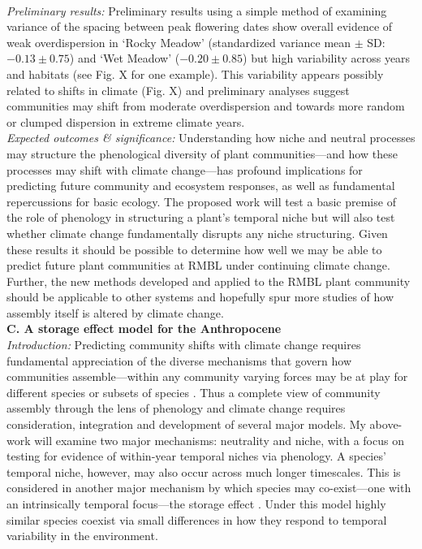 \documentclass[12pt,a4paper,oneside]{article}
\begin{document}
\vspace{1.5ex}\\
\emph{Preliminary results:} Preliminary results using a simple method of examining variance of the spacing between peak flowering dates show overall evidence of weak overdispersion in `Rocky Meadow' (standardized variance mean $\pm$ SD: $-0.13 \pm 0.75$)  and `Wet Meadow' ($-0.20 \pm 0.85$) but high variability across years and habitats (see Fig. X for one example). This variability appears possibly related to shifts in climate (Fig. X) and preliminary analyses suggest communities may shift from moderate overdispersion and towards more random or clumped dispersion in extreme climate years. 
\vspace{1.5ex}\\
\emph{Expected outcomes \& significance:}
Understanding how niche and neutral processes may structure the phenological diversity of plant communities---and how these processes may shift with climate change---has profound implications for predicting future community and ecosystem responses, as well as fundamental repercussions for basic ecology. The proposed work will test a basic premise of the role of phenology in structuring a plant's temporal niche but will also test whether climate change fundamentally disrupts any niche structuring. Given these results it should be possible to determine how well we may be able to predict future plant communities at RMBL under continuing climate change. Further, the new methods developed and applied to the RMBL plant community should be applicable to other systems and hopefully spur more studies of how assembly itself is altered by climate change. 
\vspace{1.5ex}\\
{\bf C. A storage effect model for the Anthropocene}
\vspace{1.5ex}\\
\emph{Introduction:} Predicting community shifts with climate change requires fundamental appreciation of the diverse mechanisms that govern how communities assemble---within any community varying forces may be at play for different species or subsets of species \citep{macarthur1958}. Thus a complete view of community assembly through the lens of phenology and climate change requires consideration, integration and development of several major models. My above-work will examine two major mechanisms: neutrality and niche, with a focus on testing for evidence of within-year temporal niches via phenology. A species' temporal niche, however, may also occur across much longer timescales. This is considered in another major mechanism by which species may co-exist---one with an intrinsically temporal focus---the storage effect \citep{Chesson:1997dz}. Under this model highly similar species coexist via small differences in how they respond to temporal variability in the environment.
\end{document}
